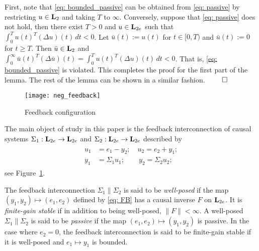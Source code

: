 \documentclass{ifacconf}
\newcommand{\Ltwo}{\boldsymbol{\rm L}_{2}}
\newcommand{\Ltwoe}{\boldsymbol{\rm L}_{2e}}
\theoremstyle{definition}
\begin{document}
\begin{pf}
  First, note that \eqref{eq: bounded_passive} can be obtained from \eqref{eq: passive} by restricting $u \in \Ltwo$ and taking $T$ to
  $\infty$. Conversely, suppose that \eqref{eq: passive} does not hold, then there exist $T > 0$ and $u \in \Ltwoe$ such that
  $\int_0^T u(t)^T (\Delta u)(t) \, dt < 0$. Let $\bar{u}(t) := u(t)$ for $t \in [0, T)$ and $\bar{u}(t) := 0$ for $t \geq T$. Then
  $\bar{u} \in \Ltwo$ and $\int_0^\infty \bar{u}(t)^T (\Delta \bar{u})(t) = \int_0^T u(t)^T (\Delta u)(t) \, dt < 0$. That is, \eqref{eq:
    bounded_passive} is violated. This completes the proof for the first part of the lemma. The rest of the lemma can be shown in a similar fashion. \hfill$\qed$
\end{pf}

\setlength{\unitlength}{0.7cm}
\begin{figure}[h]
  \centering \texttt{[image: neg\_feedback]}
  \caption{Feedback configuration} \label{fig: feedback}
\end{figure}

The main object of study in this paper is the feedback interconnection of causal systems $\Sigma_1 : \Ltwoe \to \Ltwoe$ and $\Sigma_2 : \Ltwoe \to \Ltwoe$ described by
\begin{align} \label{eq: FB}
\begin{split}
 u_1 & = e_1 - y_2; \quad u_2 = e_2 + y_1; \\
 y_1 & = \Sigma_1u_1; \qquad y_2 = \Sigma_2u_2;
\end{split}
\end{align}
see Figure~\ref{fig: feedback}.

\begin{defn} \label{def: FB} The feedback interconnection $\Sigma_1 \| \Sigma_2$ is said to be \emph{well-posed} if the map $(y_1, y_2) \mapsto (e_1, e_2)$ defined by \eqref{eq: FB}
  has a causal inverse $F$ on $\Ltwoe$. It is \emph{finite-gain stable} if in addition to being well-posed, $\|F\| < \infty$. %
A well-posed $\Sigma_1 \| \Sigma_2$ is said to be \emph{passive} if the map $(e_1, e_2) \mapsto (y_1, y_2)$ is passive. In the case where $e_2 = 0$,
the feedback interconnection is said to be finite-gain stable if it is well-posed and $e_1 \mapsto y_1$ is bounded.
\end{defn}
\end{document}
